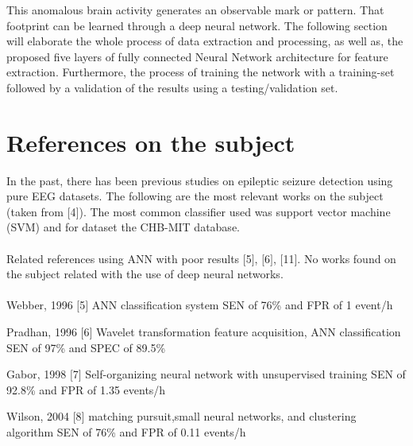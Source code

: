 \documentclass{llncs}       %
\begin{document}
This anomalous brain activity generates an observable mark or pattern. That footprint can be learned through a deep neural network. The following section will elaborate the whole process of data extraction and processing, as well as, the proposed five layers of fully connected Neural Network architecture for feature extraction. Furthermore, the process of training the network with a training-set followed by a validation of the results using a testing/validation set. 

\paragraph{}\paragraph{}

\section{References on the subject}
\label{sec:1}

In the past, there has been previous studies on epileptic seizure 
detection using pure EEG datasets. The following are the most relevant 
works on the subject (taken from $[$4$]$). The most common classifier 
used was support vector machine (SVM) and for dataset the CHB-MIT 
database. 


\paragraph{}
Related references using ANN with poor results $[$5$]$, $[$6$]$, 
$[$11$]$. No works found on the subject related with the use of deep neural networks.

\paragraph{}

Webber, 1996 $[$5$]$ ANN classification system SEN of 76\% and FPR of 1 event/h 

Pradhan, 1996 $[$6$]$  Wavelet transformation feature acquisition, ANN classification SEN of 97\% and SPEC of 89.5\% 

Gabor, 1998 $[$7$]$  Self-organizing neural network with unsupervised training SEN of 92.8\% and FPR of 1.35 events/h 

Wilson, 2004 $[$8$]$   matching pursuit,small neural networks, and clustering algorithm SEN of 76\% and FPR of 0.11 events/h 
\end{document}
